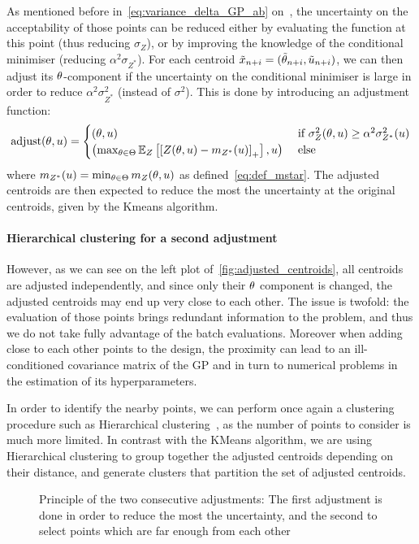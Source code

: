 \documentclass[../../Main_ManuscritThese.tex]{subfiles}
\newcommand\imgpath{/home/victor/acadwriting/Manuscrit/Text/Chapter4/img/}
\begin{document}
As mentioned before in~\cref{eq:variance_delta_GP_ab}
on~, the uncertainty on the
acceptability of those points can be reduced either by evaluating the
function at this point (thus reducing $\sigma_Z$), or by improving the
knowledge of the conditional minimiser (reducing
$\alpha^2 \sigma_{Z^*}$). For each centroid
$\tilde{x}_{n+i} = (\tilde{\theta}_{n+i}, \tilde{u}_{n+i})$, we can
then adjust its $\theta$-component if the uncertainty on the conditional
minimiser is large in order to reduce $\alpha^2 \sigma_{Z^*}^2$
(instead of $\sigma^2$). This is done by introducing an adjustment
function:
\begin{equation}
  \label{eq:adjust_centroid}
  \mathrm{adjust}(\theta,u) =
  \begin{cases}
    (\theta, u) & \text{ if }\sigma^2_Z(\theta, u) \geq \alpha^2\sigma^2_{Z^*}(u)\\
    \left(\max_{\theta\in\Theta} \mathbb{E}_Z\left[\left[Z(\theta,u) - m_{{Z^*}}(u)\right]_+ \right], u \right) & \text{ else}
  \end{cases}
\end{equation}
where $m_{{Z^*}}(u) = \min_{\theta\in\Theta} m_Z(\theta, u)$ as
defined~\eqref{eq:def_mstar}.  The adjusted centroids are then
expected to reduce the most the uncertainty at the original centroids,
given by the Kmeans algorithm.

\paragraph{Hierarchical clustering for a second adjustment}
However, as we can see on the left plot
of~\cref{fig:adjusted_centroids}, all centroids are adjusted
independently, and since only their $\theta$ component is changed, the
adjusted centroids may end up very close to each other. The issue is
twofold: the evaluation of those points brings redundant information
to the problem, and thus we do not take fully advantage of the batch
evaluations. Moreover when adding close to each other points to the
design, the proximity can lead to an ill-conditioned covariance matrix
of the GP and in turn to numerical problems in the estimation of its
hyperparameters.


In order to identify the nearby points, we can perform once
again %
a clustering procedure such as Hierarchical
clustering~\citep{nielsen_hierarchical_2016}, as the number of points
to consider is much more limited. In contrast with the KMeans
algorithm, we are using Hierarchical clustering to group together the
adjusted centroids depending on their distance, and generate clusters
that partition the set of adjusted centroids.
\begin{figure}[ht]
  \centering
  \resizebox{0.9\textwidth}{!}{}
  \caption[Principle of the two consecutive adjustments for batch
  selection]{\label{fig:schema_double_adj} Principle of the two
    consecutive adjustments: The first adjustment is done in order to
    reduce the most the uncertainty, and the second to select points
    which are far enough from each other}
\end{figure}
\end{document}
